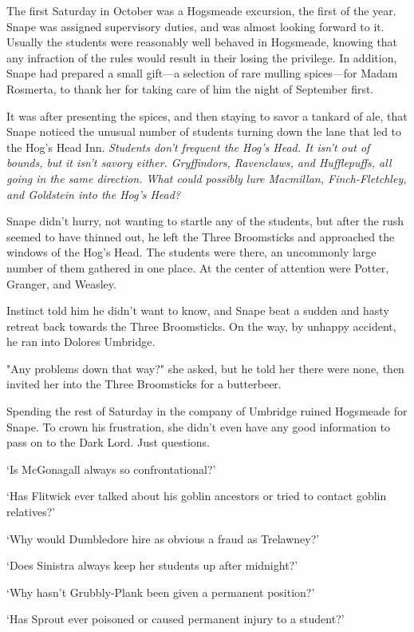 The first Saturday in October was a Hogsmeade excursion, the first of the year. Snape was assigned supervisory duties, and was almost looking forward to it. Usually the students were reasonably well behaved in Hogsmeade, knowing that any infraction of the rules would result in their losing the privilege. In addition, Snape had prepared a small gift—a selection of rare mulling spices—for Madam Rosmerta, to thank her for taking care of him the night of September first.

It was after presenting the spices, and then staying to savor a tankard of ale, that Snape noticed the unusual number of students turning down the lane that led to the Hog's Head Inn. \emph{Students don't frequent the Hog's Head. It isn't out of bounds, but it isn't savory either. Gryffindors, Ravenclaws, and Hufflepuffs, all going in the same direction. What could possibly lure Macmillan, Finch-Fletchley, and Goldstein into the Hog's Head?}

Snape didn't hurry, not wanting to startle any of the students, but after the rush seemed to have thinned out, he left the Three Broomsticks and approached the windows of the Hog's Head. The students were there, an uncommonly large number of them gathered in one place. At the center of attention were Potter, Granger, and Weasley.

Instinct told him he didn't want to know, and Snape beat a sudden and hasty retreat back towards the Three Broomsticks. On the way, by unhappy accident, he ran into Dolores Umbridge.

"Any problems down that way?" she asked, but he told her there were none, then invited her into the Three Broomsticks for a butterbeer.

Spending the rest of Saturday in the company of Umbridge ruined Hogsmeade for Snape. To crown his frustration, she didn't even have any good information to pass on to the Dark Lord. Just questions.

`Is McGonagall always so confrontational?'

`Has Flitwick ever talked about his goblin ancestors or tried to contact goblin relatives?'

`Why would Dumbledore hire as obvious a fraud as Trelawney?'

`Does Sinistra always keep her students up after midnight?'

`Why hasn't Grubbly-Plank been given a permanent position?'

`Has Sprout ever poisoned or caused permanent injury to a student?'

